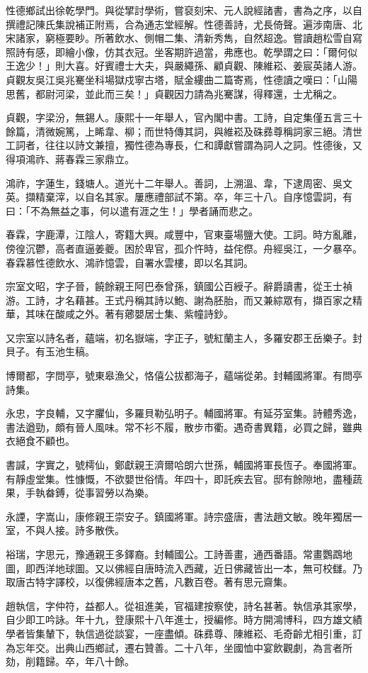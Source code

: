 \begin{pinyinscope}
性德鄉試出徐乾學門。與從揅討學術，嘗裒刻宋、元人說經諸書，書為之序，以自撰禮記陳氏集說補正附焉，合為通志堂經解。性德善詩，尤長倚聲。遍涉南唐、北宋諸家，窮極要眇。所著飲水、側帽二集、清新秀雋，自然超逸。嘗讀趙松雪自寫照詩有感，即繪小像，仿其衣冠。坐客期許過當，弗應也。乾學謂之曰：「爾何似王逸少！」則大喜。好賓禮士大夫，與嚴繩孫、顧貞觀、陳維崧、姜宸英諸人游。貞觀友吳江吳兆騫坐科場獄戍寧古塔，賦金縷曲二篇寄焉，性德讀之嘆曰：「山陽思舊，都尉河梁，並此而三矣！」貞觀因力請為兆騫謀，得釋還，士尤稱之。

貞觀，字梁汾，無錫人。康熙十一年舉人，官內閣中書。工詩，自定集僅五言三十餘篇，清微婉篤，上睎韋、柳；而世特傳其詞，與維崧及硃彞尊稱詞家三絕。清世工詞者，往往以詩文兼擅，獨性德為專長，仁和譚獻嘗謂為詞人之詞。性德後，又得項鴻祚、蔣春霖三家鼎立。

鴻祚，字蓮生，錢塘人。道光十二年舉人。善詞，上溯溫、韋，下逮周密、吳文英。擷精棄滓，以自名其家。屢應禮部試不第。卒，年三十八。自序憶雲詞，有曰：「不為無益之事，何以遣有涯之生！」學者誦而悲之。

春霖，字鹿潭，江陰人，寄籍大興。咸豐中，官東臺場鹽大使。工詞。時方亂離，傍徨沉鬱，高者直逼姜夔。困於卑官，孤介忤時，益侘傺。舟經吳江，一夕暴卒。春霖慕性德飲水、鴻祚憶雲，自署水雲樓，即以名其詞。

宗室文昭，字子晉，饒餘親王阿巴泰曾孫，鎮國公百綬子。辭爵讀書，從王士禎游。工詩，才名藉甚。王式丹稱其詩以鮑、謝為胚胎，而又兼綜眾有，擷百家之精華，其味在酸咸之外。著有薌嬰居士集、紫幢詩鈔。

又宗室以詩名者，蘊端，初名嶽端，字正子，號紅蘭主人，多羅安郡王岳樂子。封貝子。有玉池生稿。

博爾都，字問亭，號東皋漁父，恪僖公拔都海子，蘊端從弟。封輔國將軍。有問亭詩集。

永忠，字良輔，又字臞仙，多羅貝勒弘明子。輔國將軍。有延芬室集。詩體秀逸，書法遒勁，頗有晉人風味。常不衫不履，散步市衢。遇奇書異籍，必買之歸，雖典衣絕食不顧也。

書諴，字實之，號樗仙，鄭獻親王濟爾哈朗六世孫，輔國將軍長恆子。奉國將軍。有靜虛堂集。性慷慨，不欲嬰世俗情。年四十，即託疾去官。邸有餘隙地，盡種蔬果，手執畚鎛，從事習勞以為樂。

永諲，字嵩山，康修親王崇安子。鎮國將軍。詩宗盛唐，書法趙文敏。晚年獨居一室，不與人接。詩多散佚。

裕瑞，字思元，豫通親王多鐸裔。封輔國公。工詩善畫，通西番語。常畫鸚鵡地圖，即西洋地球圖。又以佛經自唐時流入西藏，近日佛藏皆出一本，無可校讎。乃取唐古特字譯校，以復佛經唐本之舊，凡數百卷。著有思元齋集。

趙執信，字仲符，益都人。從祖進美，官福建按察使，詩名甚著。執信承其家學，自少即工吟詠。年十九，登康熙十八年進士，授編修。時方開鴻博科，四方雄文績學者皆集輦下，執信過從談宴，一座盡傾。硃彞尊、陳維崧、毛奇齡尤相引重，訂為忘年交。出典山西鄉試，遷右贊善。二十八年，坐國恤中宴飲觀劇，為言者所劾，削籍歸。卒，年八十餘。


\end{pinyinscope}
